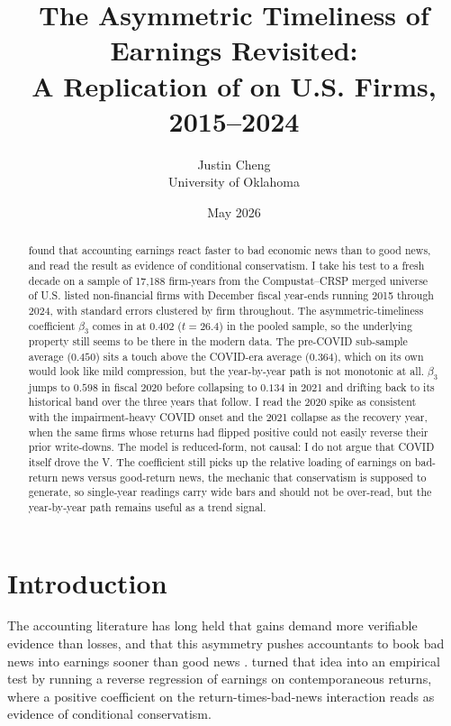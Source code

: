 \documentclass[12pt]{article}
\title{The Asymmetric Timeliness of Earnings Revisited: \\
A Replication of \citet{basu1997} on U.S. Firms, 2015--2024}
\author{Justin Cheng \\ University of Oklahoma}
\date{May 2026}
\begin{document}
\maketitle

\begin{abstract}
\noindent
\citet{basu1997} found that accounting earnings react faster to bad economic news than to good news, and read the result as evidence of conditional conservatism. I take his test to a fresh decade on a sample of 17{,}188 firm-years from the Compustat--CRSP merged universe of U.S. listed non-financial firms with December fiscal year-ends running 2015 through 2024, with standard errors clustered by firm throughout. The asymmetric-timeliness coefficient $\beta_3$ comes in at $0.402$ ($t=26.4$) in the pooled sample, so the underlying property still seems to be there in the modern data. The pre-COVID sub-sample average ($0.450$) sits a touch above the COVID-era average ($0.364$), which on its own would look like mild compression, but the year-by-year path is not monotonic at all. $\beta_3$ jumps to $0.598$ in fiscal 2020 before collapsing to $0.134$ in 2021 and drifting back to its historical band over the three years that follow. I read the 2020 spike as consistent with the impairment-heavy COVID onset and the 2021 collapse as the recovery year, when the same firms whose returns had flipped positive could not easily reverse their prior write-downs. The model is reduced-form, not causal: I do not argue that COVID itself drove the V. The coefficient still picks up the relative loading of earnings on bad-return news versus good-return news, the mechanic that conservatism is supposed to generate, so single-year readings carry wide bars and should not be over-read, but the year-by-year path remains useful as a trend signal.
\end{abstract}

\section{Introduction}
The accounting literature has long held that gains demand more verifiable evidence than losses, and that this asymmetry pushes accountants to book bad news into earnings sooner than good news \citep{watts2003a, watts2003b}. \citet{basu1997} turned that idea into an empirical test by running a reverse regression of earnings on contemporaneous returns, where a positive coefficient on the return-times-bad-news interaction reads as evidence of conditional conservatism.
\end{document}

